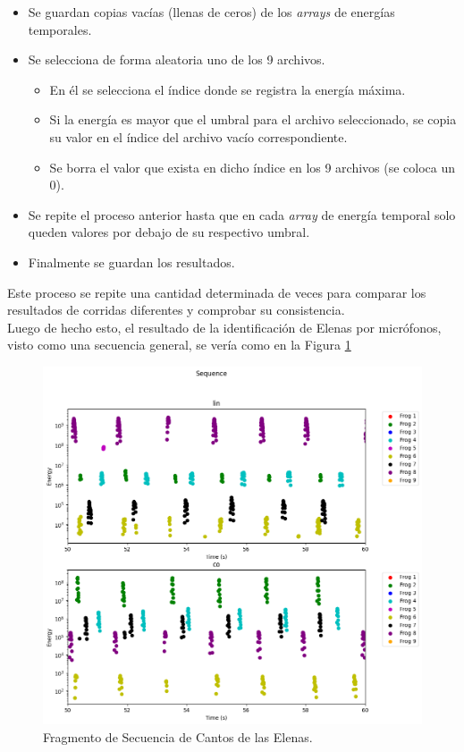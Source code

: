 \documentclass[a4paper,10pt,twocolumn]{article}
\begin{document}
\begin{itemize}
	\item Se guardan copias vacías (llenas de ceros) de los \textit{arrays} de energías temporales.
	\item Se selecciona de forma aleatoria uno de los 9 archivos. 
	\begin{itemize}
		\item En él se selecciona el índice donde se registra la energía máxima. 
		\item Si la energía es mayor que el umbral para el archivo seleccionado, se copia su valor en el índice del archivo vacío correspondiente.
		\item Se borra el valor que exista en dicho índice en los 9 archivos (se coloca un 0).
	\end{itemize}
	\item Se repite el proceso anterior hasta que en cada \textit{array} de energía temporal solo queden valores por debajo de su respectivo umbral.
	\item Finalmente se guardan los resultados.
\end{itemize}

Este proceso se repite una cantidad determinada de veces para comparar los resultados de corridas diferentes y comprobar su consistencia.\\


Luego de hecho esto, el resultado de la identificación de Elenas por micrófonos, visto como una secuencia general, se vería como en la Figura \ref{fig:seq}

\begin{figure}[h!]
    \centering
    \includegraphics[width=\columnwidth]{assets/sequence.png}
    \caption{Fragmento de Secuencia de Cantos de las Elenas.}
    \label{fig:seq}
\end{figure}
\end{document}
